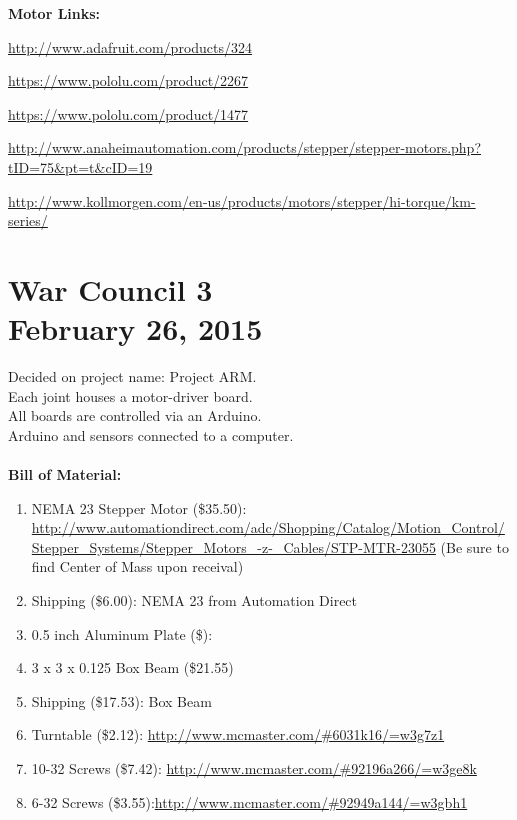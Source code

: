 \documentclass[11pt]{article}
\begin{document}

\noindent \textbf{Motor Links:}
\begin{compactitem}
	\item \url{http://www.adafruit.com/products/324}
	\item \url{https://www.pololu.com/product/2267}
	\item \url{https://www.pololu.com/product/1477}
	\item \url{http://www.anaheimautomation.com/products/stepper/stepper-motors.php?tID=75&pt=t&cID=19}
	\item \url{http://www.kollmorgen.com/en-us/products/motors/stepper/hi-torque/km-series/}
\end{compactitem}

\section{War Council 3 \\ February 26, 2015}
Decided on project name: Project ARM.\\
Each joint houses a motor-driver board.\\
All boards are controlled via an Arduino.\\
Arduino and sensors connected to a computer.\\
\\
\noindent \textbf{Bill of Material:}\\
\begin{enumerate}
	\item NEMA 23 Stepper Motor (\$35.50): \url{http://www.automationdirect.com/adc/Shopping/Catalog/Motion_Control/Stepper_Systems/Stepper_Motors_-z-_Cables/STP-MTR-23055} (Be sure to find Center of Mass upon receival)
	\item Shipping (\$6.00): NEMA 23 from Automation Direct
	\item 0.5 inch Aluminum Plate (\$):
	\item 3 x 3 x 0.125 Box Beam (\$21.55)
	\item Shipping (\$17.53): Box Beam
	\item Turntable (\$2.12): \url{http://www.mcmaster.com/#6031k16/=w3g7z1}
	\item 10-32 Screws (\$7.42): \url{http://www.mcmaster.com/#92196a266/=w3ge8k}
	\item 6-32 Screws (\$3.55):\url{http://www.mcmaster.com/#92949a144/=w3gbh1}
\end{enumerate}
\end{document}
